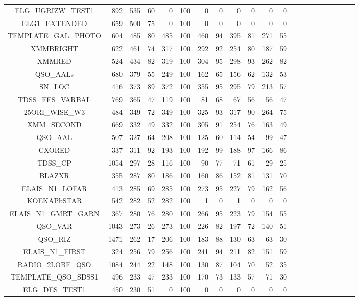 \documentclass[onecolumn]{aa}
\begin{document}
\begin{center}
\begin{longtable}{c rrr rrr rrrrrrrrrrrrrr}
ELG\_UGRIZW\_TEST1 & 892 & 535 & 60 & 0 & 100 & 0 & 0 & 0 & 0 & 0 & 0 \\ 
ELG1\_EXTENDED & 659 & 500 & 75 & 0 & 100 & 0 & 0 & 0 & 0 & 0 & 0 \\ 
TEMPLATE\_GAL\_PHOTO & 604 & 485 & 80 & 485 & 100 & 460 & 94 & 395 & 81 & 271 & 55 \\ 
XMMBRIGHT & 622 & 461 & 74 & 317 & 100 & 292 & 92 & 254 & 80 & 187 & 59 \\ 
XMMRED & 524 & 434 & 82 & 319 & 100 & 304 & 95 & 298 & 93 & 262 & 82 \\ 
QSO\_AALs & 680 & 379 & 55 & 249 & 100 & 162 & 65 & 156 & 62 & 132 & 53 \\ 
SN\_LOC & 416 & 373 & 89 & 372 & 100 & 355 & 95 & 295 & 79 & 213 & 57 \\ 
TDSS\_FES\_VARBAL & 769 & 365 & 47 & 119 & 100 & 81 & 68 & 67 & 56 & 56 & 47 \\ 
25ORI\_WISE\_W3 & 484 & 349 & 72 & 349 & 100 & 325 & 93 & 317 & 90 & 264 & 75 \\ 
XMM\_SECOND & 669 & 332 & 49 & 332 & 100 & 305 & 91 & 254 & 76 & 163 & 49 \\ 
QSO\_AAL & 507 & 327 & 64 & 208 & 100 & 125 & 60 & 114 & 54 & 99 & 47 \\ 
CXORED & 337 & 311 & 92 & 193 & 100 & 192 & 99 & 188 & 97 & 166 & 86 \\ 
TDSS\_CP & 1054 & 297 & 28 & 116 & 100 & 90 & 77 & 71 & 61 & 29 & 25 \\ 
BLAZXR & 355 & 287 & 80 & 186 & 100 & 160 & 86 & 152 & 81 & 131 & 70 \\ 
ELAIS\_N1\_LOFAR & 413 & 285 & 69 & 285 & 100 & 273 & 95 & 227 & 79 & 162 & 56 \\ 
KOEKAPbSTAR & 542 & 282 & 52 & 282 & 100 & 1 & 0 & 1 & 0 & 0 & 0 \\ 
ELAIS\_N1\_GMRT\_GARN & 367 & 280 & 76 & 280 & 100 & 266 & 95 & 223 & 79 & 154 & 55 \\ 
QSO\_VAR & 1043 & 273 & 26 & 273 & 100 & 226 & 82 & 197 & 72 & 140 & 51 \\ 
QSO\_RIZ & 1471 & 262 & 17 & 206 & 100 & 183 & 88 & 130 & 63 & 63 & 30 \\ 
ELAIS\_N1\_FIRST & 324 & 256 & 79 & 256 & 100 & 241 & 94 & 211 & 82 & 151 & 59 \\ 
RADIO\_2LOBE\_QSO & 1084 & 244 & 22 & 148 & 100 & 130 & 87 & 104 & 70 & 52 & 35 \\ 
TEMPLATE\_QSO\_SDSS1 & 496 & 233 & 47 & 233 & 100 & 170 & 73 & 133 & 57 & 71 & 30 \\ 
ELG\_DES\_TEST1 & 450 & 230 & 51 & 0 & 100 & 0 & 0 & 0 & 0 & 0 & 0 \\ 

\end{longtable}
\end{center}
\end{document}
